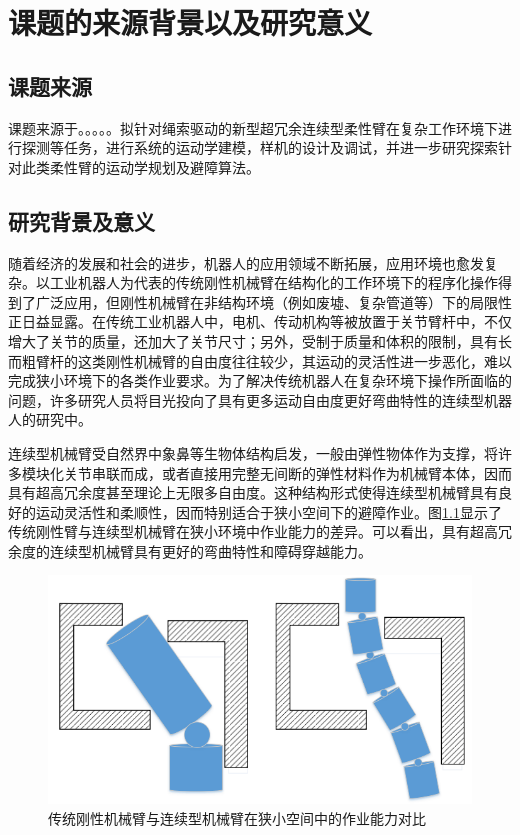 \chapter{课题的来源背景以及研究意义}
\section{课题来源}

课题来源于。。。。。拟针对绳索驱动的新型超冗余连续型柔性臂在复杂工作环境下进行探测等任务，进行系统的运动学建模，样机的设计及调试，并进一步研究探索针对此类柔性臂的运动学规划及避障算法。
\section{研究背景及意义}

随着经济的发展和社会的进步，机器人的应用领域不断拓展，应用环境也愈发复杂。以工业机器人为代表的传统刚性机械臂在结构化的工作环境下的程序化操作得到了广泛应用，但刚性机械臂在非结构环境（例如废墟、复杂管道等）下的局限性正日益显露。在传统工业机器人中，电机、传动机构等被放置于关节臂杆中，不仅增大了关节的质量，还加大了关节尺寸；另外，受制于质量和体积的限制，具有长而粗臂杆的这类刚性机械臂的自由度往往较少，其运动的灵活性进一步恶化，难以完成狭小环境下的各类作业要求。为了解决传统机器人在复杂环境下操作所面临的问题，许多研究人员将目光投向了具有更多运动自由度更好弯曲特性的连续型机器人的研究中。

连续型机械臂受自然界中象鼻等生物体结构启发，一般由弹性物体作为支撑，将许多模块化关节串联而成，或者直接用完整无间断的弹性材料作为机械臂本体，因而具有超高冗余度甚至理论上无限多自由度。这种结构形式使得连续型机械臂具有良好的运动灵活性和柔顺性，因而特别适合于狭小空间下的避障作业。图\ref{fig:compare_tra_con}显示了传统刚性臂与连续型机械臂在狭小环境中作业能力的差异。可以看出，具有超高冗余度的连续型机械臂具有更好的弯曲特性和障碍穿越能力。
\begin{figure}[!htbp]
	\centering
	\includegraphics[width=.75\textwidth]{figures/compare_tra_con.png}
	\caption{传统刚性机械臂与连续型机械臂在狭小空间中的作业能力对比}
	\label{fig:compare_tra_con}
\end{figure}

